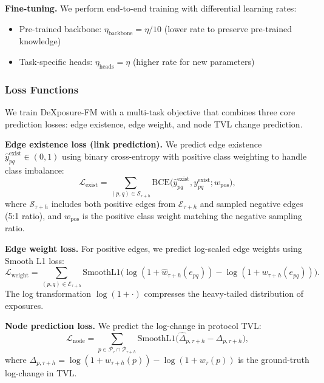 \textbf{Fine-tuning.}
We perform end-to-end training with differential learning rates:
\begin{itemize}
  \item Pre-trained backbone: $\eta_{\text{backbone}} = \eta / 10$ (lower rate to preserve pre-trained knowledge)
  \item Task-specific heads: $\eta_{\text{heads}} = \eta$ (higher rate for new parameters)
\end{itemize}

\subsubsection{Loss Functions}
\label{sec:training:loss}

We train DeXposure-FM with a multi-task objective that combines three core prediction losses: edge existence, edge weight, and node TVL change prediction.

\textbf{Edge existence loss (link prediction).}
We predict edge existence $\widehat{y}^{\mathrm{exist}}_{pq} \in (0,1)$ using binary cross-entropy with positive class weighting to handle class imbalance:
\begin{equation}
\mathcal L_{\mathrm{exist}} = \sum_{(p,q) \in \mathcal S_{\tau+h}} \mathrm{BCE}\bigl(\widehat{y}^{\mathrm{exist}}_{pq}, y^{\mathrm{exist}}_{pq}; w_{\mathrm{pos}}\bigr),
\label{eq:loss-exist}
\end{equation}
where $\mathcal S_{\tau+h}$ includes both positive edges from $\mathcal E_{\tau+h}$ and sampled negative edges (5:1 ratio), and $w_{\mathrm{pos}}$ is the positive class weight matching the negative sampling ratio.

\textbf{Edge weight loss.}
For positive edges, we predict log-scaled edge weights using Smooth L1 loss:
\begin{equation}
\mathcal L_{\mathrm{weight}} = \sum_{(p,q) \in \mathcal E_{\tau+h}} \mathrm{SmoothL1}\bigl(\log(1+\widehat{w}_{\tau+h}(e_{pq})) - \log(1+w_{\tau+h}(e_{pq}))\bigr).
\label{eq:loss-weight}
\end{equation}
The log transformation $\log(1+\cdot)$ compresses the heavy-tailed distribution of exposures.

\textbf{Node prediction loss.}
We predict the log-change in protocol TVL:
\begin{equation}
\mathcal L_{\mathrm{node}} = \sum_{p \in \mathcal P_{\tau} \cap \mathcal P_{\tau+h}} \mathrm{SmoothL1}\bigl(\widehat{\Delta}_{p,\tau+h} - \Delta_{p,\tau+h}\bigr),
\label{eq:loss-node}
\end{equation}
where $\Delta_{p,\tau+h} = \log(1+w_{\tau+h}(p)) - \log(1+w_{\tau}(p))$ is the ground-truth log-change in TVL.

